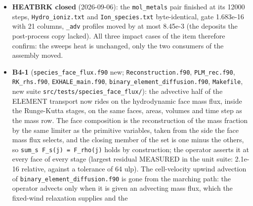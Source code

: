 \documentclass[english,a4paper]{my_memo}
\begin{document}
\begin{itemize}
  the channel over recombination, not over-statement; its header text now
  says so. Advisor follow-ups applied directly: the \texttt{D1\ He+\ +\ CO} term added
  to the He+ decomposition of \texttt{constrained\_chemical\_equilibrium.f90}
  (\texttt{hydrogen\_helium\_row\_terms}, whose header requires every \texttt{mol\_heh\_rows}
  reaction to appear), the \texttt{FUV\_bands.txt}/\texttt{Oxygen\_chemistry.txt}
  \texttt{dom\_cells\_HeP} header rewritten, the stale \texttt{n\_co} comment of
  \texttt{ion\_cell\_state.f90} replaced. Private build: \texttt{physics\_probe} 592/0 (incl.
  \texttt{co\_helium\_ion\_sink} 8), \texttt{fuv\_band\_ledger} 24/0. Remaining: the operator
  split is now a LAG (the sweep destroys He+ at the entry CO while the CO row
  destroys CO at the previous sweep\textquotesingle s He+) and \texttt{oxygen\_chemistry} never
  covers a carrier interval in init mode, so this row has no end-to-end
  gate: B4-1c/B5 territory, recorded.
\item
  \textbf{HEATBRK closed} (2026-09-06): the \texttt{mol\_metals} pair finished at its
  12000 steps, \texttt{Hydro\_ioniz.txt} and \texttt{Ion\_species.txt} byte-identical, gate
  1.683e-16 with 21 columns, \texttt{\_adv} profiles moved by at most 8.45e-3 (the
  deposits the post-process copy lacked). All three impact cases of the item
  therefore confirm: the sweep\textquotesingle s heat is unchanged, only the two consumers
  of the assembly moved.
\item
  \textbf{B4-1} (\texttt{species\_face\_flux.f90} new; \texttt{Reconstruction.f90}, \texttt{PLM\_rec.f90},
  \texttt{RK\_rhs.f90}, \texttt{EXHALE\_main.f90}, \texttt{binary\_element\_diffusion.f90}, \texttt{Makefile},
  new suite \texttt{src/tests/species\_face\_flux/}): the advective half of the ELEMENT
  transport now rides on the hydrodynamic face mass flux, inside the
  Runge-Kutta stages, on the same faces, areas, volumes and time step as the
  mass row. The face composition is the reconstruction of the mass fraction by
  the same limiter as the primitive variables, taken from the side the face
  mass flux selects, and the closing member of the set is one minus the
  others, so \texttt{sum\_s\ F\_s(j)\ =\ F\_rho(j)} holds by construction; the operator
  asserts it at every face of every stage (largest residual MEASURED in the
  unit suite: 2.1e-16 relative, against a tolerance of 64 ulp). The
  cell-velocity upwind advection of \texttt{binary\_element\_diffusion.f90} is gone
  from the marching path: the operator advects only when it is given an
  advecting mass flux, which the fixed-wind relaxation supplies and the

\end{itemize}
\end{document}
